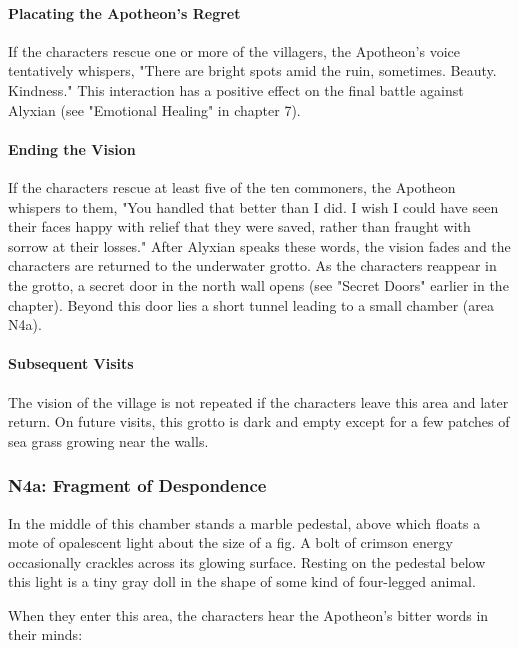 \documentclass[10pt,a4paper,twoside,bg=print,twocolumn,openany,nodeprecatedcode]{dndbook}
\begin{document}
\paragraph{Placating the Apotheon's Regret}
If the characters rescue one or more of the villagers, the Apotheon's voice tentatively whispers, "There are bright spots amid the ruin, sometimes. Beauty. Kindness." This interaction has a positive effect on the final battle against Alyxian (see "Emotional Healing" in chapter 7).

\paragraph{Ending the Vision}
If the characters rescue at least five of the ten commoners, the Apotheon whispers to them, "You handled that better than I did. I wish I could have seen their faces happy with relief that they were saved, rather than fraught with sorrow at their losses." After Alyxian speaks these words, the vision fades and the characters are returned to the underwater grotto. As the characters reappear in the grotto, a secret door in the north wall opens (see "Secret Doors" earlier in the chapter). Beyond this door lies a short tunnel leading to a small chamber (area N4a).

\paragraph{Subsequent Visits}
The vision of the village is not repeated if the characters leave this area and later return. On future visits, this grotto is dark and empty except for a few patches of sea grass growing near the walls.

\subsubsection{N4a: Fragment of Despondence}
\begin{DndReadAloud}{}
In the middle of this chamber stands a marble pedestal, above which floats a mote of opalescent light about the size of a fig. A bolt of crimson energy occasionally crackles across its glowing surface. Resting on the pedestal below this light is a tiny gray doll in the shape of some kind of four-legged animal.

\end{DndReadAloud}

When they enter this area, the characters hear the Apotheon's bitter words in their minds:
\end{document}
